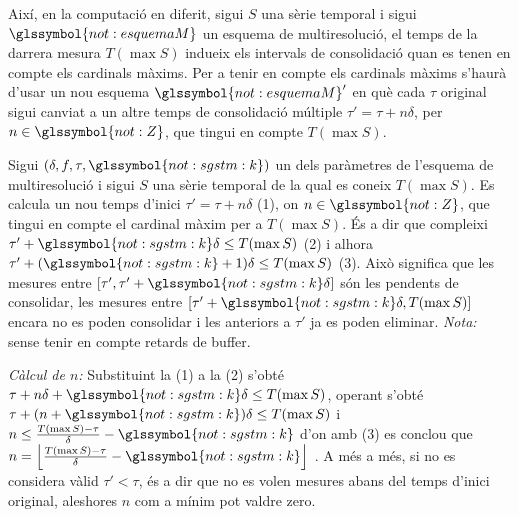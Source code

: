 Així, en la computació en diferit, sigui $S$ una sèrie temporal i
sigui $\glssymbol{not:esquemaM}$ un esquema de multiresolució, el
temps de la darrera mesura $T(\max S)$ indueix els intervals de
consolidació quan es tenen en compte els cardinals màxims. Per a tenir
en compte els cardinals màxims s'haurà d'usar un nou esquema
$\glssymbol{not:esquemaM}'$ en què cada $\tau$ original sigui canviat
a un altre temps de consolidació múltiple $\tau'= \tau+n\delta$, per
$n\in\glssymbol{not:Z}$, que tingui en compte $T(\max S)$.



\begin{definition}
  \label{def:mapreduce:ajustamentdetaus}

  Sigui $(\delta,f,\tau,\glssymbol{not:sgstm:k})$ un dels paràmetres
  de l'esquema de multiresolució i sigui $S$ una sèrie temporal de la
  qual es coneix $T(\max S)$.  Es calcula un nou temps d'inici $\tau'=
  \tau+n\delta$ (1), on $n\in\glssymbol{not:Z}$, que tingui en compte
  el cardinal màxim per a $T(\max S)$. És a dir que compleixi
  $\tau'+\glssymbol{not:sgstm:k}\delta \leq T(\max S)$ (2) i alhora
  $\tau'+(\glssymbol{not:sgstm:k}+1)\delta \leq T(\max S)$ (3).  Això
  significa que les mesures entre
  $[\tau',\tau'+\glssymbol{not:sgstm:k}\delta]$ són les pendents de
  consolidar, les mesures entre
  $[\tau'+\glssymbol{not:sgstm:k}\delta,T(\max S)]$ encara no es poden
  consolidar i les anteriors a $\tau'$ ja es poden
  eliminar. \emph{Nota:} sense tenir en compte retards de buffer.


  \emph{Càlcul de $n$:} Substituint la (1) a la (2) s'obté
  $\tau+n\delta+\glssymbol{not:sgstm:k}\delta \leq T(\max S)$, operant
  s'obté $\tau+(n+\glssymbol{not:sgstm:k})\delta \leq T(\max S)$ i $n
  \leq \frac{T(\max S)-\tau}{\delta}-\glssymbol{not:sgstm:k}$ d'on amb
  (3) es conclou que $n = \left\lfloor \frac{T(\max
      S)-\tau}{\delta}-\glssymbol{not:sgstm:k} \right\rfloor$ .  A més
  a més, si no es considera vàlid $\tau'<\tau$, és a dir que no es
  volen mesures abans del temps d'inici original, aleshores $n$ com a
  mínim pot valdre zero.

\end{definition}



